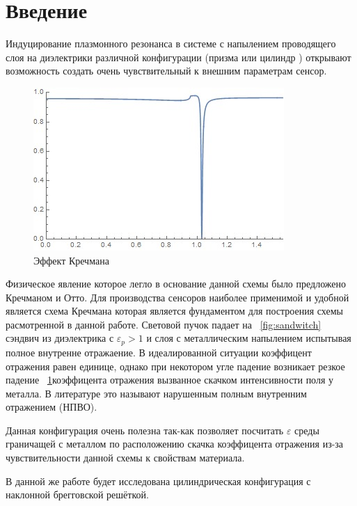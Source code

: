 






\section*{Введение}\label{intro}

Индуцирование плазмонного резонанса в системе с напылением проводящего слоя на диэлектрики различной конфигурации (призма или цилиндр ) открывают возможность создать очень чувствительный к внешним параметрам сенсор.

\begin{figure}[h!]
	\centering
	\includegraphics[width=0.5\linewidth]{kretchmann}
	\caption{Эффект Кречмана}\label{fig:kretchmann}
\end{figure}



Физическое явление которое легло в основание данной схемы было предложено Кречманом и Отто. Для производства сенсоров наиболее применимой и удобной является схема Кречмана которая является фундаментом для построения схемы расмотренной в данной работе.
Световой пучок падает на ~\ref{fig:sandwitch} сэндвич из диэлектрика с $ \varepsilon_p >1 $ и слоя с металлическим напылением испытывая полное внутренне отражаение. В идеалированной ситуации коэффицент отражения равен единице, однако при некотором угле падение возникает резкое падение ~\ref{fig:kretchmann}коэффицента отражения вызванное скачком интенсивности поля у металла. В литературе это называют нарушенным полным внутренним отражением (НПВО).

Данная конфигурация очень полезна так-как позволяет посчитать $ \varepsilon $ среды граничащей с металлом по расположению скачка коэффицента отражения из-за чувствительности данной схемы к свойствам материала.

В данной же работе будет исследована цилиндрическая конфигурация с наклонной брегговской решёткой.


